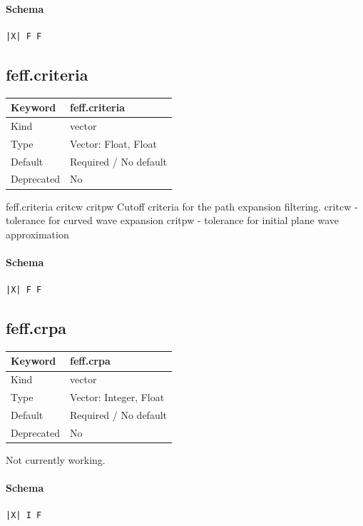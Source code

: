 \documentclass[11pt]{article}
\begin{document}
{{{\paragraph{Schema}
\begin{Verbatim}
|X| F F
\end{Verbatim}

\subsection{feff.criteria}
\label{kw:feff-criteria}
\begin{longtable}{|p{1.5in}|p{4.5in}|}
\hline
Keyword & feff.criteria \\
\hline
Kind & vector \\
\hline
Type & Vector: Float, Float \\
\hline
Default & Required / No default \\
\hline
Deprecated & No \\
\hline
\end{longtable}
 feff.criteria{ critcw critpw }
 Cutoff criteria for the path expansion filtering.
 critcw - tolerance for curved wave expansion
 critpw - tolerance for initial plane wave approximation

\paragraph{Schema}
\begin{Verbatim}
|X| F F
\end{Verbatim}

\subsection{feff.crpa}
\label{kw:feff-crpa}
\begin{longtable}{|p{1.5in}|p{4.5in}|}
\hline
Keyword & feff.crpa \\
\hline
Kind & vector \\
\hline
Type & Vector: Integer, Float \\
\hline
Default & Required / No default \\
\hline
Deprecated & No \\
\hline
\end{longtable}
 Not currently working.

\paragraph{Schema}
\begin{Verbatim}
|X| I F
\end{Verbatim}

}}}
\end{document}
